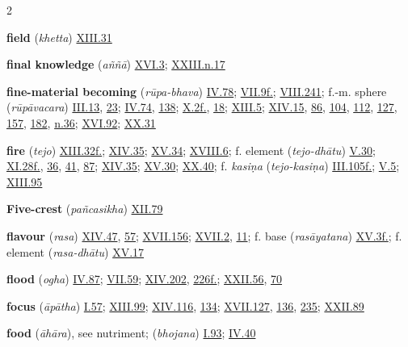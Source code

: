 \begin{multicols}{2}
\begin{vismHanging}
\par\textbf{field} (\emph{khetta}) \hyperlink{XIII.31}{XIII.31}{}
\par\textbf{final knowledge} (\emph{aññā}) \hyperlink{XVI.3}{XVI.3}{}; \hyperlink{XXIII.n17}{XXIII.n.17}{}
\par\textbf{fine-material becoming} (\emph{rūpa-bhava}) \hyperlink{IV.78}{IV.78}{}; \hyperlink{VII.9}{VII.9f.}{}; \hyperlink{VIII.241}{VIII.241}{}; f.-m. sphere (\emph{rūpāvacara}) \hyperlink{III.13}{III.13}{}, \hyperlink{III.23}{23}{}; \hyperlink{IV.74}{IV.74}{}, \hyperlink{IV.138}{138}{}; \hyperlink{X.2}{X.2f.}{}, \hyperlink{X.18}{18}{}; \hyperlink{XIII.5}{XIII.5}{}; \hyperlink{XIV.15}{XIV.15}{}, \hyperlink{XIV.86}{86}{}, \hyperlink{XIV.104}{104}{}, \hyperlink{XIV.112}{112}{}, \hyperlink{XIV.127}{127}{}, \hyperlink{XIV.157}{157}{}, \hyperlink{XIV.182}{182}{}, \hyperlink{XIV.n36}{n.36}{}; \hyperlink{XVI.92}{XVI.92}{}; \hyperlink{XX.31}{XX.31}{}
\par\textbf{fire} (\emph{tejo}) \hyperlink{XIII.32}{XIII.32f.}{}; \hyperlink{XIV.35}{XIV.35}{}; \hyperlink{XV.34}{XV.34}{}; \hyperlink{XVIII.6}{XVIII.6}{}; f. element (\emph{tejo-dhātu}) \hyperlink{V.30}{V.30}{}; \hyperlink{XI.28}{XI.28f.}{}, \hyperlink{XI.36}{36}{}, \hyperlink{XI.41}{41}{}, \hyperlink{XI.87}{87}{}; \hyperlink{XIV.35}{XIV.35}{}; \hyperlink{XV.30}{XV.30}{}; \hyperlink{XX.40}{XX.40}{}; f. \emph{kasiṇa }(\emph{tejo-kasiṇa}) \hyperlink{III.105}{III.105f.}{}; \hyperlink{V.5}{V.5}{}; \hyperlink{XIII.95}{XIII.95}{}
\par\textbf{Five-crest} (\emph{pañcasikha}) \hyperlink{XII.79}{XII.79}{}
\par\textbf{flavour} (\emph{rasa}) \hyperlink{XIV.47}{XIV.47}{}, \hyperlink{XIV.57}{57}{}; \hyperlink{XVII.156}{XVII.156}{}; \hyperlink{XVII.2}{XVII.2}{}, \hyperlink{XVII.11}{11}{}; f. base (\emph{rasāyatana}) \hyperlink{XV.3}{XV.3f.}{}; f. element (\emph{rasa-dhātu}) \hyperlink{XV.17}{XV.17}{}
\par\textbf{flood} (\emph{ogha}) \hyperlink{IV.87}{IV.87}{}; \hyperlink{VII.59}{VII.59}{}; \hyperlink{XIV.202}{XIV.202}{}, \hyperlink{XIV.226}{226f.}{}; \hyperlink{XXII.56}{XXII.56}{}, \hyperlink{XXII.70}{70}{}
\par\textbf{focus} (\emph{āpātha}) \hyperlink{I.57}{I.57}{}; \hyperlink{XIII.99}{XIII.99}{}; \hyperlink{XIV.116}{XIV.116}{}, \hyperlink{XIV.134}{134}{}; \hyperlink{XVII.127}{XVII.127}{}, \hyperlink{XVII.136}{136}{}, \hyperlink{XVII.235}{235}{}; \hyperlink{XXII.89}{XXII.89}{}
\par\textbf{food} (\emph{āhāra}), see nutriment; (\emph{bhojana}) \hyperlink{I.93}{I.93}{}; \hyperlink{IV.40}{IV.40}{}

\end{vismHanging}
\end{multicols}
